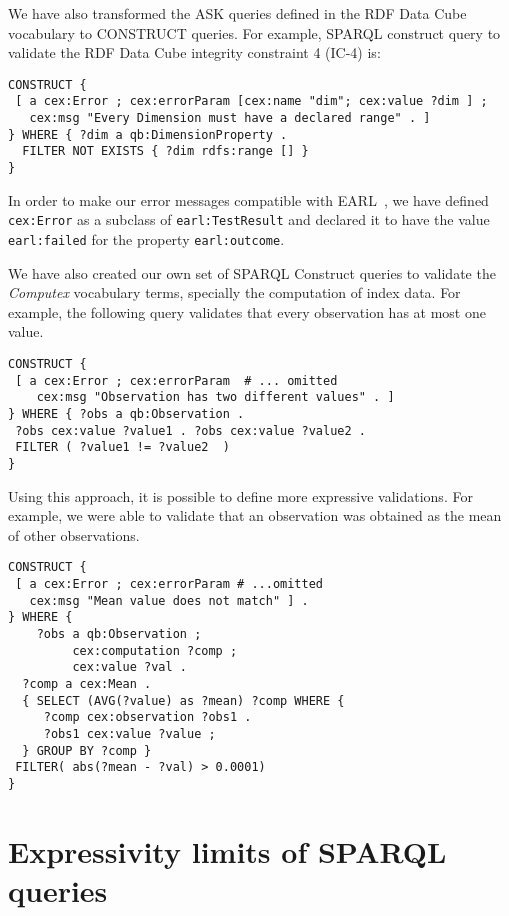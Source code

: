  We have also transformed the ASK queries defined in the RDF Data Cube
 vocabulary to CONSTRUCT queries. For example, SPARQL construct query to validate the RDF Data Cube integrity
 constraint 4 (IC-4) is:
 
\begin{lstlisting}[style=SPARQL]
CONSTRUCT {
 [ a cex:Error ; cex:errorParam [cex:name "dim"; cex:value ?dim ] ;
   cex:msg "Every Dimension must have a declared range" . ]
} WHERE { ?dim a qb:DimensionProperty .
  FILTER NOT EXISTS { ?dim rdfs:range [] }
}
\end{lstlisting}
 
In order to make our error messages compatible with EARL~\cite{EARL}, we have
 defined \lstinline|cex:Error| as a subclass of \lstinline|earl:TestResult| and 
 declared it to have the value \lstinline|earl:failed| for the property
 \lstinline|earl:outcome|.
 
We have also created our own set of SPARQL Construct queries to validate the
 \emph{Computex} vocabulary terms, specially the computation of index data.
For example, the following query validates that every observation 
  has at most one value.
 
\begin{lstlisting}[style=SPARQL]
CONSTRUCT {
 [ a cex:Error ; cex:errorParam  # ... omitted 
    cex:msg "Observation has two different values" . ]
} WHERE { ?obs a qb:Observation . 
 ?obs cex:value ?value1 . ?obs cex:value ?value2 .
 FILTER ( ?value1 != ?value2  )
}
\end{lstlisting}

Using this approach, it is possible to define more expressive validations.
For example, we were able to validate that an observation was obtained as the
mean of other observations. 

\begin{lstlisting}[style=SPARQL]
CONSTRUCT {
 [ a cex:Error ; cex:errorParam # ...omitted 
   cex:msg "Mean value does not match" ] . 
} WHERE { 
    ?obs a qb:Observation ;
         cex:computation ?comp ;
         cex:value ?val .
  ?comp a cex:Mean .
  { SELECT (AVG(?value) as ?mean) ?comp WHERE {
     ?comp cex:observation ?obs1 .
	 ?obs1 cex:value ?value ;
  } GROUP BY ?comp } 
 FILTER( abs(?mean - ?val) > 0.0001)
}
\end{lstlisting}

\section{Expressivity limits of SPARQL queries}

